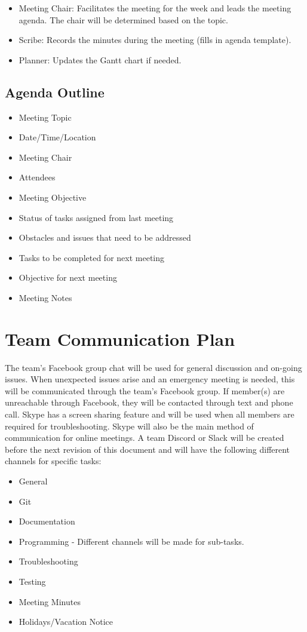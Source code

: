 \documentclass{article}
\begin{document}
\begin{itemize}
\item Meeting Chair: Facilitates the meeting for the week and leads the meeting agenda. The chair will be determined based on the topic.
\item Scribe: Records the minutes during the meeting (fills in agenda template).
\item Planner: Updates the Gantt chart if needed.
\end{itemize}

\subsection{Agenda Outline}
\begin{itemize}
\item Meeting Topic
\item Date/Time/Location
\item Meeting Chair
\item Attendees
\item Meeting Objective
\item Status of tasks assigned from last meeting
\item Obstacles and issues that need to be addressed
\item Tasks to be completed for next meeting
\item Objective for next meeting
\item Meeting Notes

\end{itemize}
\section{Team Communication Plan}
\hspace{5mm}The team's Facebook group chat will be used for general discussion and on-going issues. When unexpected issues arise and an emergency meeting is needed, this will be communicated through the team's Facebook group. If member(s) are unreachable through Facebook, they will be contacted through text and phone call.
Skype has a screen sharing feature and will be used when all members are required for troubleshooting. Skype will also be the main method of communication for online meetings.
A team Discord or Slack will be created before the next revision of this document and will have the following different channels for specific tasks:
\begin{itemize}
\item General
\item Git
\item Documentation
\item Programming - Different channels will be made for sub-tasks.
\item Troubleshooting
\item Testing
\item Meeting Minutes
\item Holidays/Vacation Notice

\end{itemize}
\end{document}
